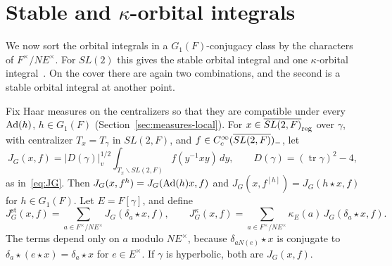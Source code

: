 \section{Stable and \texorpdfstring{$\kappa$}{kappa}-orbital
integrals}\label{sec:kappa}

We now sort the orbital integrals in a $G_1(F)$-conjugacy class by the
characters of $F^\times/N E^\times$. For $SL(2)$ this gives the stable
orbital integral and one $\kappa$-orbital integral~\cite{LL79}. On the
cover there are again two combinations, and the second is a stable
orbital integral at another point.

Fix Haar measures on the centralizers so that they are compatible under
every $\operatorname{Ad}(h)$, $h\in G_1(F)$ (Section~\ref{sec:measures-local}).
For $x\in\overline{SL(2,F)}_{\mathrm{reg}}$ over $\gamma$, with centralizer $T_x=T_\gamma$
in $SL(2,F)$, and $f\in C_c^\infty(\overline{SL(2,F)})_-$, let
\[
J_G(x,f)=|D(\gamma)|_v^{1/2}\int_{T_x\backslash SL(2,F)}f(y^{-1}xy)\,dy,
\qquad D(\gamma)=(\operatorname{tr}\gamma)^2-4,
\]
as in~\eqref{eq:JG}. Then $J_G(x,f^h)=J_G(\operatorname{Ad}(h)x,f)$ and
$J_G(x,f^{[h]})=J_G(h\star x,f)$ for $h\in G_1(F)$. Let $E=F[\gamma]$,
and define
\begin{equation}\label{eq:Jst}
J^{\mathrm{st}}_G(x,f)=\sum_{a\in F^\times/N E^\times}J_G(\delta_a\star x,f),
\qquad
J^{\kappa}_G(x,f)=\sum_{a\in F^\times/N E^\times}\kappa_E(a)\,
J_G(\delta_a\star x,f).
\end{equation}
The terms depend only on $a$ modulo $N E^\times$, because $\delta_{aN(e)}
\star x$ is conjugate to $\delta_a\star(e\star x)=\delta_a\star x$ for
$e\in E^\times$. If $\gamma$ is hyperbolic, both are $J_G(x,f)$.

